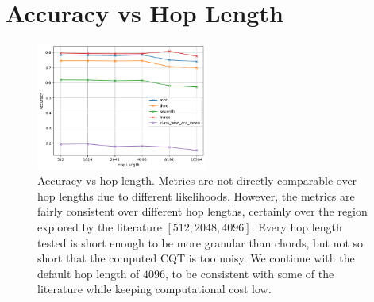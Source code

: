 \section{Accuracy vs Hop Length}\label{app:accuracy_vs_hop_length}

\begin{figure}[h]
    \centering
    \includegraphics[width=0.5\textwidth]{figures/hop_length_vs_accuracy.png}
    \caption{Accuracy vs hop length. Metrics are not directly comparable over hop lengths due to different likelihoods. However, the metrics are fairly consistent over different hop lengths, certainly over the region explored by the literature $[512,2048,4096]$. Every hop length tested is short enough to be more granular than chords, but not so short that the computed CQT is too noisy. We continue with the default hop length of $4096$, to be consistent with some of the literature while keeping computational cost low.}
    \label{fig:accuracy_vs_hop_length}
\end{figure}